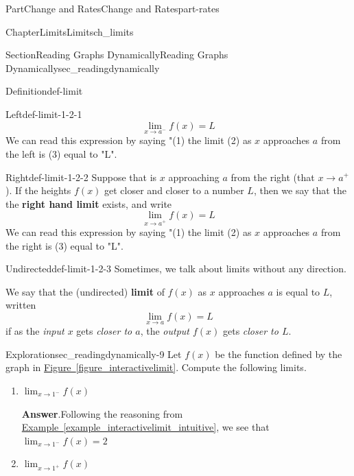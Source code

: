\documentclass{tufte-book}
\newcommand{\blocktitlefont}{\relax}
\newcommand{\xreffont}{\relax}
\newcommand{\terminology}[1]{\textbf{#1}}
\numberwithin{equation}{chapter}
\begin{document}
\begin{partptx}{Part}{Change and Rates}{}{Change and Rates}{}{}{part-rates}
\begin{chapterptx}{Chapter}{Limits}{}{Limits}{}{}{ch_limits}
\begin{sectionptx}{Section}{Reading Graphs Dynamically}{}{Reading Graphs Dynamically}{}{}{sec_readingdynamically}
\begin{definition}{Definition}{}{def-limit}
\begin{descriptionlist}
\begin{dlimedium}{Left}{def-limit-1-2-1}
\begin{equation*}
\lim_{x\rightarrow a^-} f(x) = L
\end{equation*}
We can read this expression by saying "(1) the limit (2) as \(x\) approaches \(a\) from the left is (3) equal to "L".%
\end{dlimedium}%
\begin{dlimedium}{Right}{def-limit-1-2-2}%
Suppose that is \(x\) approaching \(a\) from the right (that \(x\rightarrow a^+\)). If the heights \(f(x)\) get closer and closer to a number \(L\), then we say that the the \terminology{right hand limit} exists, and write%
\begin{equation*}
\lim_{x\rightarrow a^+} f(x) = L
\end{equation*}
We can read this expression by saying "(1) the limit (2) as \(x\) approaches \(a\) from the right is (3) equal to "L".%
\end{dlimedium}%
\begin{dlimedium}{Undirected}{def-limit-1-2-3}%
Sometimes, we talk about limits without any direction.%
\par
We say that the (undirected) \terminology{limit} of \(f(x)\) as \(x\) approaches \(a\) is equal to \(L\), written%
\begin{equation*}
\lim_{x\rightarrow a} f(x) = L
\end{equation*}
if  as the \emph{input \(x\)} gets \emph{closer to \(a\)}, the \emph{output \(f(x)\)} gets \emph{closer to \(L\)}.%
\end{dlimedium}%
\end{descriptionlist}
\end{definition}
\begin{exploration}{Exploration}{}{sec_readingdynamically-9}%
Let \(f(x)\) be the function defined by the graph in \hyperref[figure_interactivelimit]{Figure~{\xreffont\ref{figure_interactivelimit}}}. Compute the following limits.%
\begin{enumerate}[font=\bfseries,label=(\alph*),ref=\alph*]%
\item{}\(\displaystyle \lim_{x\rightarrow 1^-} f(x)\)%
\par\smallskip%
\noindent\textbf{\blocktitlefont Answer}.\hypertarget{sec_readingdynamically-9-2-2}{}\quad{}Following the reasoning from \hyperref[example_interactivelimit_intuitive]{Example~{\xreffont\ref{example_interactivelimit_intuitive}}}, we see that \(\displaystyle \lim_{x\rightarrow 1^-} f(x)=2\)%
\item{}\(\displaystyle \lim_{x\rightarrow 1^+} f(x)\)%

\end{enumerate}
\end{exploration}
\end{sectionptx}
\end{chapterptx}
\end{partptx}
\end{document}
